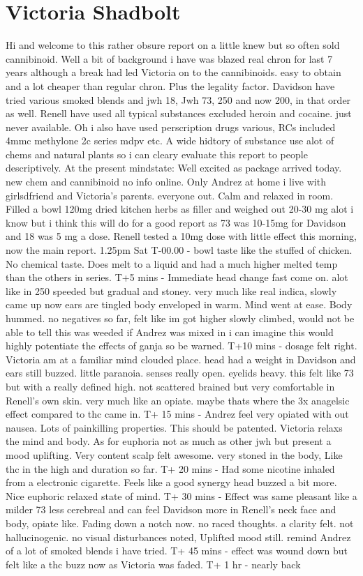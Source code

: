 \documentclass[12pt]{book}
\begin{document}
\chapter{Victoria Shadbolt}

Hi and welcome to this rather obsure report on a little knew but so often sold cannibinoid. Well a bit of background i have was blazed real chron for last 7 years although a break had led Victoria on to the cannibinoids. easy to obtain and a lot cheaper than regular chron. Plus the legality factor. Davidson have tried various smoked blends and jwh 18, Jwh 73, 250 and now 200, in that order as well. Renell have used all typical substances excluded heroin and cocaine. just never available. Oh i also have used perscription drugs various, RCs included 4mmc methylone 2c series mdpv etc. A wide hidtory of substance use alot of chems and natural plants so i can cleary evaluate this report to people descriptively. At the present mindstate: Well excited as package arrived today. new chem and cannibinoid no info online. Only Andrez at home i live with girlsdfriend and Victoria's parents. everyone out. Calm and relaxed in room. Filled a bowl 120mg dried kitchen herbs as filler and weighed out 20-30 mg alot i know but i think this will do for a good report as 73 was 10-15mg for Davidson and 18 was 5 mg a dose. Renell tested a 10mg dose with little effect this morning, now the main report. 1.25pm Sat T-00.00 - bowl taste like the stuffed of chicken. No chemical taste. Does melt to a liquid and had a much higher melted temp than the others in series. T+5 mins - Immediate head change fast come on. alot like in 250 speeded but gradual and stoney. very much like real indica, slowly came up now ears are tingled body enveloped in warm. Mind went at ease. Body hummed. no negatives so far, felt like im got higher slowly climbed, would not be able to tell this was weeded if Andrez was mixed in i can imagine this would highly potentiate the effects of ganja so be warned. T+10 mins - dosage felt right. Victoria am at a familiar mind clouded place. head had a weight in Davidson and ears still buzzed. little paranoia. senses really open. eyelids heavy. this felt like 73 but with a really defined high. not scattered brained but very comfortable in Renell's own skin. very much like an opiate. maybe thats where the 3x anagelsic effect compared to thc came in. T+ 15 mins - Andrez feel very opiated with out nausea. Lots of painkilling properties. This should be patented. Victoria relaxs the mind and body. As for euphoria not as much as other jwh but present a mood uplifting. Very content scalp felt awesome. very stoned in the body, Like thc in the high and duration so far. T+ 20 mins - Had some nicotine inhaled from a electronic cigarette. Feels like a good synergy head buzzed a bit more. Nice euphoric relaxed state of mind. T+ 30 mins - Effect was same pleasant like a milder 73 less cerebreal and can feel Davidson more in Renell's neck face and body, opiate like. Fading down a notch now. no raced thoughts. a clarity felt. not hallucinogenic. no visual disturbances noted, Uplifted mood still. remind Andrez of a lot of smoked blends i have tried. T+ 45 mins - effect was wound down but felt like a thc buzz now as Victoria was faded. T+ 1 hr - nearly back 
\end{document}
